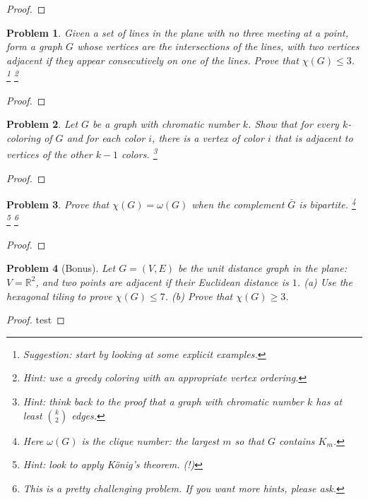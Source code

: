 \documentclass[11pt]{article}
\newtheorem{problem}{Problem}
\begin{document}
\begin{proof}

\end{proof}


\pagebreak


\begin{problem}
Given a set of lines in the plane with no three meeting at a point, form a graph $G$ whose vertices are the intersections of the lines, with two vertices adjacent if they appear consecutively on one of the lines. Prove that $\chi(G)\le3$. 
\footnote{Suggestion: start by looking at some explicit examples.} \footnote{Hint: use a greedy coloring with an appropriate vertex ordering.} 
\end{problem}

\begin{proof}

\end{proof}


\pagebreak



\begin{problem}
Let $G$ be a graph with chromatic number $k$. Show that for every $k$-coloring of $G$ and for each color $i$, there is a vertex of color $i$ that is adjacent to vertices of the other $k-1$ colors. \footnote{Hint: think back to the proof that a graph with chromatic number $k$ has at least ${k\choose 2}$ edges.}
\end{problem}

\begin{proof}

\end{proof}

\pagebreak

\begin{problem}
Prove that $\chi(G)=\omega(G)$ when the complement $\bar G$ is bipartite. \footnote{Here $\omega(G)$ is the clique number: the largest $m$ so that $G$ contains $K_m$.} \footnote{Hint: look to apply K\"onig's theorem. (!)}
\footnote{This is a pretty challenging problem. If you want more hints, please ask.} 
\end{problem}

\begin{proof}

\end{proof}

\pagebreak

\begin{problem}[Bonus]
Let $G=(V,E)$ be the unit distance graph in the plane: $V=\mathbb R^2$, and two points are adjacent if their Euclidean distance is $1$. (a) Use the hexagonal tiling to prove $\chi(G)\le7$. (b) Prove that $\chi(G)\ge3$.
\end{problem}

\begin{proof}
test
\end{proof}
\end{document}
